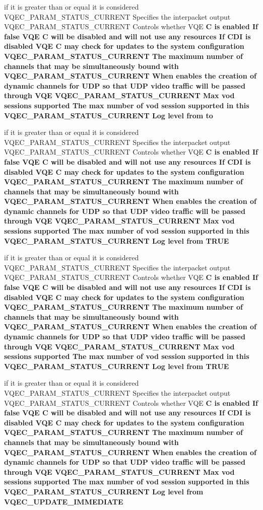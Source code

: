 \begin{CompactItemize}
\item 
if it is greater than or equal it is considered VQEC\_\-PARAM\_\-STATUS\_\-CURRENT Specifies the interpacket output VQEC\_\-PARAM\_\-STATUS\_\-CURRENT Controls whether VQE \bf{C} is enabled If false VQE \bf{C} will be disabled and will not use any resources If CDI is disabled VQE \bf{C} may check for updates \bf{to} the system configuration VQEC\_\-PARAM\_\-STATUS\_\-CURRENT The maximum number of \bf{channels} that may be simultaneously bound with VQEC\_\-PARAM\_\-STATUS\_\-CURRENT When enables the creation of dynamic \bf{channels} for UDP so that UDP video traffic will be passed through VQE VQEC\_\-PARAM\_\-STATUS\_\-CURRENT Max vod sessions supported The max number of vod session supported in \bf{this} VQEC\_\-PARAM\_\-STATUS\_\-CURRENT Log level from \bf{to}
\item 
if it is greater than or equal it is considered VQEC\_\-PARAM\_\-STATUS\_\-CURRENT Specifies the interpacket output VQEC\_\-PARAM\_\-STATUS\_\-CURRENT Controls whether VQE \bf{C} is enabled If false VQE \bf{C} will be disabled and will not use any resources If CDI is disabled VQE \bf{C} may check for updates \bf{to} the system configuration VQEC\_\-PARAM\_\-STATUS\_\-CURRENT The maximum number of \bf{channels} that may be simultaneously bound with VQEC\_\-PARAM\_\-STATUS\_\-CURRENT When enables the creation of dynamic \bf{channels} for UDP so that UDP video traffic will be passed through VQE VQEC\_\-PARAM\_\-STATUS\_\-CURRENT Max vod sessions supported The max number of vod session supported in \bf{this} VQEC\_\-PARAM\_\-STATUS\_\-CURRENT Log level from \bf{TRUE}
\item 
if it is greater than or equal it is considered VQEC\_\-PARAM\_\-STATUS\_\-CURRENT Specifies the interpacket output VQEC\_\-PARAM\_\-STATUS\_\-CURRENT Controls whether VQE \bf{C} is enabled If false VQE \bf{C} will be disabled and will not use any resources If CDI is disabled VQE \bf{C} may check for updates \bf{to} the system configuration VQEC\_\-PARAM\_\-STATUS\_\-CURRENT The maximum number of \bf{channels} that may be simultaneously bound with VQEC\_\-PARAM\_\-STATUS\_\-CURRENT When enables the creation of dynamic \bf{channels} for UDP so that UDP video traffic will be passed through VQE VQEC\_\-PARAM\_\-STATUS\_\-CURRENT Max vod sessions supported The max number of vod session supported in \bf{this} VQEC\_\-PARAM\_\-STATUS\_\-CURRENT Log level from \bf{TRUE}
\item 
if it is greater than or equal it is considered VQEC\_\-PARAM\_\-STATUS\_\-CURRENT Specifies the interpacket output VQEC\_\-PARAM\_\-STATUS\_\-CURRENT Controls whether VQE \bf{C} is enabled If false VQE \bf{C} will be disabled and will not use any resources If CDI is disabled VQE \bf{C} may check for updates \bf{to} the system configuration VQEC\_\-PARAM\_\-STATUS\_\-CURRENT The maximum number of \bf{channels} that may be simultaneously bound with VQEC\_\-PARAM\_\-STATUS\_\-CURRENT When enables the creation of dynamic \bf{channels} for UDP so that UDP video traffic will be passed through VQE VQEC\_\-PARAM\_\-STATUS\_\-CURRENT Max vod sessions supported The max number of vod session supported in \bf{this} VQEC\_\-PARAM\_\-STATUS\_\-CURRENT Log level from \bf{VQEC\_\-UPDATE\_\-IMMEDIATE}

\end{CompactItemize}
